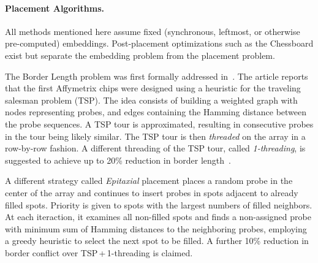 \documentclass[english]{lni}
\newcommand{\ignore}[1]{}
\begin{document}
\paragraph{Placement Algorithms.}
All methods mentioned here assume fixed (synchronous, leftmost, or
otherwise pre-computed) embeddings. Post-placement optimizations such
as the Chessboard \cite{KAHNG02} exist but separate the embedding problem from the
placement problem.

The Border Length problem
was first formally addressed in~\cite{HANNENHALLI02}. The article reports that
the first Affymetrix chips were designed using a heuristic for the traveling
salesman problem (TSP). The idea consists of building a weighted graph with
nodes representing probes, and edges containing the Hamming distance between
the probe sequences. A TSP tour is approximated, resulting in consecutive
probes in the tour being likely similar. The TSP tour is then
\emph{threaded} on the array in a row-by-row fashion. A different threading of
the TSP tour, called \emph{1-threading}, is suggested to achieve
up to 20\% reduction in border length~\cite{HANNENHALLI02}.

A different strategy called \emph{Epitaxial} placement
\cite{KAHNG02} places a random probe in the center of the array and continues
to insert probes in spots adjacent to already filled spots. Priority is given
to spots with the largest numbers of filled neighbors. At each iteraction, it
examines all non-filled spots and finds a non-assigned probe with
minimum sum of Hamming distances to the neighboring probes, employing
a greedy heuristic to select the next spot to be filled. A further 10\%
reduction in border conflict over TSP\,+\,1-threading is claimed.

\ignore{
The major problem with the epitaxial and the TSP-based algorithm is that they
have at least quadratic time complexity and thus are not scalable for the
latest million-probe microarrays. According to their experiments, the TSP
approach needed around 32 minutes to produce the layout of a 200\,x\,200 chip,
whereas the epitaxial algorithm needed 74 minutes on average. For a 500\,x\,500
chip, the TSP took over 30 hours to complete, whereas the epitaxial algorithm
did not complete ``due to prohibitively large running time or memory
requirements'' \cite{KAHNG02}.
}

\ignore{
This observation has led to the development of two new algorithms by
\cite{KAHNG03A}. The first one, called sliding-window matching (SWM), is not
exactly a placement algorithm as it iteratively improves an initial placement
that can be constructed by, for instance, TSP and 1-threading. Improvements
are achieved by selecting an independent set of spots inside the window and
optimally replacing their probes using a minimum-weight perfect matching
algorithm. The term independent refers to probes that can be replaced without
affecting the border length of the other selected probes.
}
\end{document}
